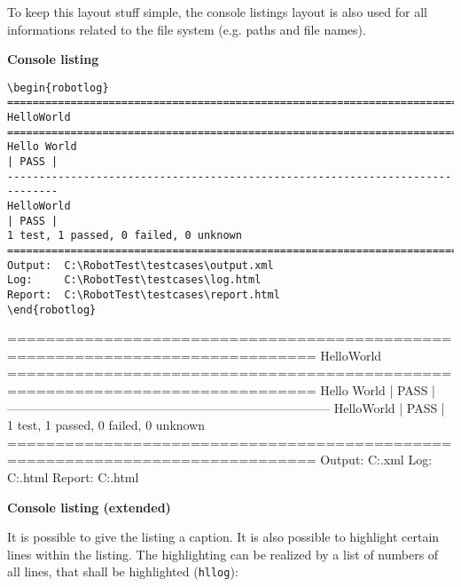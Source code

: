 \documentclass[a4paper,10pt]{report}
\begin{document}
To keep this layout stuff simple, the console listings layout is also used for all informations related to the file system (e.g. paths and file names).

\vspace{2ex}

\textbf{Console listing}

\begin{verbatim}
\begin{robotlog}
==============================================================================
HelloWorld
==============================================================================
Hello World                                                           | PASS |
------------------------------------------------------------------------------
HelloWorld                                                            | PASS |
1 test, 1 passed, 0 failed, 0 unknown
==============================================================================
Output:  C:\RobotTest\testcases\output.xml
Log:     C:\RobotTest\testcases\log.html
Report:  C:\RobotTest\testcases\report.html
\end{robotlog}
\end{verbatim}

\newpage

\begin{robotlog}
==============================================================================
HelloWorld
==============================================================================
Hello World                                                           | PASS |
------------------------------------------------------------------------------
HelloWorld                                                            | PASS |
1 test, 1 passed, 0 failed, 0 unknown
==============================================================================
Output:  C:\RobotTest\testcases\output.xml
Log:     C:\RobotTest\testcases\log.html
Report:  C:\RobotTest\testcases\report.html
\end{robotlog}

\vspace{2ex}

\textbf{Console listing (extended)}

It is possible to give the listing a caption. It is also possible to highlight certain lines within the listing. The highlighting can be realized by a list
of numbers of all lines, that shall be highlighted (\texttt{hllog}):

\vspace{2ex}
\end{document}
